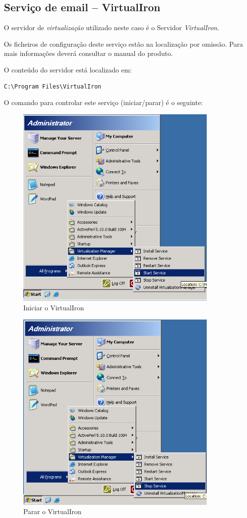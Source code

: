 \subsection{Serviço de email -- VirtualIron}

O servidor de \emph{virtualização} utilizado neste caso é o Servidor \emph{VirtualIron}.

Os ficheiros de configuração deste serviço estão na localização por omissão. Para mais informações deverá consultar o manual do produto.

O conteúdo do servidor está localizado em:

\begin{Verbatim}
C:\Program Files\VirtualIron
\end{Verbatim}

O comando para controlar este serviço (iniciar/parar) é o seguinte:

\begin{figure}[H]
    \begin{center}
        \includegraphics[width=10cm]{include/img/vi-win-start}
    \end{center}
    \caption{Iniciar o VirtualIron}
    \label{fig:VI-WIN1}
\end{figure}


\begin{figure}[H]
    \begin{center}
        \includegraphics[width=10cm]{include/img/vi-win-stop}
    \end{center}
    \caption{Parar o VirtualIron}
    \label{fig:VI-WIN2}
\end{figure}




